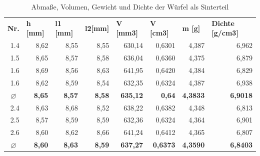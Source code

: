   \FloatBarrier
  \begin{table}[h]
    \centering
    \caption{Abmaße, Volumen, Gewicht und Dichte der Würfel als Sinterteil}
      \begin{tabular}{crrrrrrr}
      \toprule
      \textbf{Nr.} & \multicolumn{1}{l}{\textbf{h [mm]}} & \multicolumn{1}{l}{\textbf{l1 [mm]}} & \multicolumn{1}{l}{\textbf{l2[mm]}} & \multicolumn{1}{l}{\textbf{V [mm3]}} & \multicolumn{1}{l}{\textbf{V [cm3]}} & \multicolumn{1}{l}{\textbf{m [g]}} & \multicolumn{1}{l}{\textbf{Dichte [g/cm3]}} \\
      \multicolumn{1}{r}{1.4} & 8,62 & 8,55 & 8,55  & 630,14 & 0,6301 & 4,387 & 6,962 \\
      \multicolumn{1}{r}{1.5} & 8,65 & 8,57 & 8,58  & 636,04 & 0,6360 & 4,375 & 6,879 \\
      \multicolumn{1}{r}{1.6} & 8,69 & 8,56 & 8,63 & 641,95 & 0,6420 & 4,384  & 6,829 \\
      \multicolumn{1}{r}{1.6} & 8,62 & 8,59 & 8,54 & 632,35 & 0,6324 & 4,387  & 6,938 \\
      \textbf{\textbf{$\varnothing$}} & \textbf{8,65} & \textbf{8,57} & \textbf{8,58} & \textbf{635,12} & \textbf{0,64} & \textbf{4,3833} & \textbf{6,9018} \\
      \midrule
      \multicolumn{1}{r}{2.4} & 8,63  & 8,68 & 8,52 & 638,22 & 0,6382 & 4,348 & 6,813 \\
      \multicolumn{1}{r}{2.5} & 8,57 & 8,59  & 8,59 & 632,36 & 0,6324 & 4,364 & 6,901 \\
      \multicolumn{1}{r}{2.6} & 8,60  & 8,62 & 8,66 & 641,24 & 0,6412 & 4,365 & 6,807 \\
      \textbf{\textbf{$\varnothing$}} & \textbf{8,60} & \textbf{8,63} & \textbf{8,59} & \textbf{637,27} & \textbf{0,6373} & \textbf{4,3590} & \textbf{6,8403} \\
      \bottomrule
      \end{tabular}%
    \label{Sinterteilmaße}%
  \end{table}%
  \FloatBarrier
  
